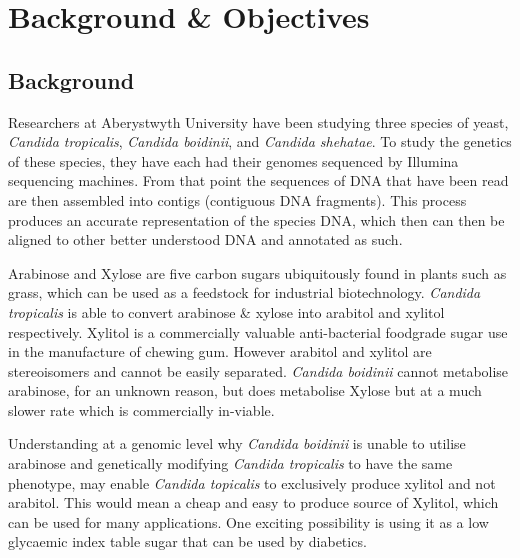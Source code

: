 \chapter{Background \& Objectives}

% 
% 
%    
%    

\section{Background}
Researchers at Aberystwyth University have been studying three species of yeast, \textit{Candida tropicalis}, \textit{Candida boidinii}, and \textit{Candida shehatae}. To study the genetics of these species, they have each had their genomes sequenced by Illumina sequencing machines. From that point the sequences of DNA that have been read are then assembled into contigs (contiguous DNA fragments). This process produces an accurate representation of the species DNA, which then can then be aligned to other better understood DNA and annotated as such.

Arabinose and Xylose are five carbon sugars ubiquitously found in plants such as grass, which can be used as a feedstock for industrial biotechnology. \textit{Candida tropicalis} is able to convert arabinose \& xylose into arabitol and xylitol respectively. Xylitol is a commercially valuable anti-bacterial foodgrade sugar use in the manufacture of chewing gum. However arabitol and xylitol are stereoisomers and cannot be easily separated. \textit{Candida boidinii} cannot metabolise arabinose, for an unknown reason, but does metabolise Xylose but at a much slower rate which is commercially in-viable.

Understanding at a genomic level why \textit{Candida boidinii} is unable to utilise arabinose and genetically modifying \textit{Candida tropicalis} to have the same phenotype, may enable \textit{Candida topicalis} to exclusively produce xylitol and not arabitol. This would mean a cheap and easy to produce source of Xylitol, which can be used for many applications. One exciting possibility is using it as a low glycaemic index table sugar that can be used by diabetics.

